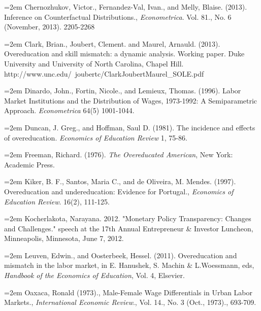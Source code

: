 \documentclass[11pt]{article}
\theoremstyle{definition}
\begin{document}
\vspace{2mm}
\noindent
\hangindent=2em
Chernozhukov, Victor., Fernandez-Val, Ivan., and Melly, Blaise. (2013). Inference on Counterfactual Distributions., \textit{Econometrica}. Vol. 81., No. 6 (November, 2013). 2205-2268

\vspace{2mm}
\noindent
\hangindent=2em
Clark, Brian., Joubert, Clement. and Maurel, Arnauld. (2013). Overeducation and skill mismatch: a dynamic analysis. Working paper. Duke University and University of North Carolina, Chapel Hill. http://www.unc.edu/~joubertc/ClarkJoubertMaurel\_SOLE.pdf

\vspace{2mm}
\noindent
\hangindent=2em
Dinardo, John., Fortin, Nicole., and Lemieux, Thomas. (1996). Labor Market Institutions and the Distribution of Wages, 1973-1992: A Semiparametric Approach. \textit{Econometrica} 64(5) 1001-1044.

\vspace{2mm}
\noindent
\hangindent=2em
Duncan, J. Greg., and Hoffman, Saul D. (1981). The incidence and effects of overeducation. \textit{Economics of Education Review} 1, 75-86.

\vspace{2mm}
\noindent
\hangindent=2em
Freeman, Richard. (1976). \textit{The Overeducated American}, New York: Academic Press. 

\vspace{2mm}
\noindent
\hangindent=2em
Kiker, B. F., Santos, Maria C., and de Oliveira, M. Mendes. (1997). Overeducation and undereducation: Evidence for Portugal., \textit{Economics of Education Review}. 16(2), 111-125.

\vspace{2mm}
\noindent
\hangindent=2em
Kocherlakota, Narayana. 2012. "Monetary Policy Transparency: Changes and Challenges." speech at the 17th Annual Entrepreneur \& Investor Luncheon, Minneapolis, Minnesota, June 7, 2012.


\vspace{2mm}
\noindent
\hangindent=2em
Leuven, Edwin., and Oosterbeek, Hessel. (2011). Overeducation and mismatch in the labor market,
in E. Hanushek, S. Machin \& L.Woessmann, eds, \textit{Handbook of the Economics of
Education}, Vol. 4, Elsevier.

\vspace{2mm}
\noindent
\hangindent=2em
Oaxaca, Ronald (1973)., Male-Female Wage Differentials in Urban Labor Markets.,  \textit{International Economic Review}., Vol. 14., No. 3 (Oct., 1973)., 693-709.
\end{document}
